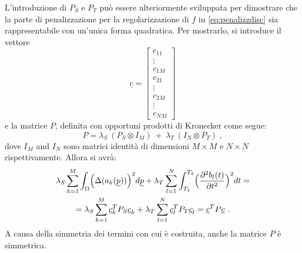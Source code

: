 \documentclass[a4paper,11pt,twoside,openright]{book}							%
\begin{document}
L'introduzione di $P_S$ e $P_T$ può essere ulteriormente sviluppata per dimostrare che la parte di penalizzazione per la regolarizzazione di $f$ in \ref{eq:penalizzdisc} sia rappresentabile con un'unica forma quadratica. Per mostrarlo, si introduce il vettore
$$\underline c =
\begin{bmatrix}
c_{11}  \\
\vdots\\
c_{1M}  \\
c_{21}  \\
\vdots\\
c_{2M}  \\
\vdots\\
c_{NM}
\end{bmatrix}
$$
e la matrice $P$, definita con opportuni prodotti di Kronecker come segue:
$$
P = \lambda_S\    (P_S \otimes I_M)   \ +\  \lambda_T\   (I_N \otimes P_T) \ ,
$$
dove $I_M$ and $I_N$ sono matrici identità di dimensioni $M \times M$ e $N \times N$ rispettivamente. Allora si avrà:
\begin{multline}
\lambda_S  \sum_{k=1}^M \int_{\Omega} \Bigl( \Delta(  a_k(\underline p)  ) \Bigr)^2 d \underline p + \lambda_T \sum_{l=1}^N\int_{T_1}^{T_2} \Bigl( \frac{\partial^2   b_l(t)   }{\partial t ^2} \Bigr)^2 dt =
\\ = \lambda_S\sum_{k=1}^M\underline{c}_k^T P_S \underline{c}_k + \lambda_T\sum_{l=1}^N\underline{c}_l^T P_T \underline{c}_l = \underline{c}^T P \underline{c} \ .
\end{multline}
A causa della simmetria dei termini con cui è costruita, anche la matrice $P$ è simmetrica.
\end{document}
